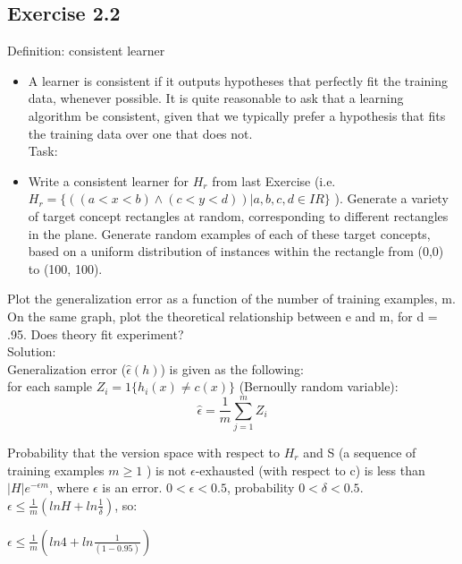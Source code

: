 \documentclass[a4paper, 12pt]{article}
\begin{document}
\subsection*{Exercise 2.2}

Definition: consistent learner

\begin{itemize}
\item A learner is consistent if it outputs hypotheses that perfectly fit the training data, whenever possible. It is quite reasonable to ask that a learning algorithm be consistent, given that we typically prefer a hypothesis that fits the training data over one that does not. \\

Task:
\item Write a consistent learner for $H_r$ from last Exercise (i.e. $H_r = \{((a < x < b) \wedge (c < y < d)) | a, b, c, d \in IR\}$ ). Generate a variety of target concept rectangles at random, corresponding to different rectangles in the plane. Generate random examples of each of these target concepts, based on a uniform distribution of instances within the rectangle from (0,0) to (100, 100).

\end{itemize}

Plot the generalization error  as a function of the number of training examples, m. On the same graph, plot the theoretical relationship between e and m, for d = .95. Does theory fit experiment?\\

Solution:\\

Generalization error ($ \hat{\epsilon} (h)$) is given as the following:\\

for each sample $Z_i = 1\{ h_i(x) \neq c(x) \}$ (Bernoully random variable):\\

$$\hat{\epsilon} = \frac{1}{m}\sum_{j=1}^{m} Z_i$$

Probability that the version space with respect to $H_r$ and S (a sequence of training examples $m\geqslant 1$ ) is not $\epsilon$-exhausted (with respect to c) is less than $|H| e^{-\epsilon m}$, where  $\epsilon$ is an error. $0<\epsilon<0.5$, probability $0<\delta<0.5$.\\

$\epsilon \leqslant \frac{1}{m}(lnH + ln\frac{1}{\delta})$, so:

$\epsilon \leqslant \frac{1}{m}(ln4 + ln\frac{1}{(1-0.95)})$\\
\end{document}
